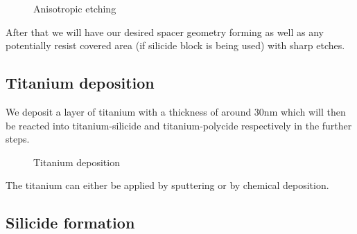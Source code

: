 \begin{figure}[H]
	\centering
	\begin{tikzpicture}[node distance = 3cm, auto, thick,scale=\CrossSectionOnly, every node/.style={transform shape}]
		
	\end{tikzpicture}
	\begin{tikzpicture}[node distance = 3cm, auto, thick,scale=\CrossSectionOnly, every node/.style={transform shape}]
		
	\end{tikzpicture}
	\caption{Anisotropic etching}
\end{figure}

After that we will have our desired spacer geometry forming as well as any potentially resist covered area (if silicide block is being used) with sharp etches.

\newpage

\subsection{Titanium deposition}

We deposit a layer of titanium with a thickness of around 30nm which will then be reacted into titanium-silicide and titanium-polycide respectively in the further steps.

\begin{figure}[H]
	\centering
	\begin{tikzpicture}[node distance = 3cm, auto, thick,scale=\CrossSectionOnly, every node/.style={transform shape}]
		
	\end{tikzpicture}
	\begin{tikzpicture}[node distance = 3cm, auto, thick,scale=\CrossSectionOnly, every node/.style={transform shape}]
		
	\end{tikzpicture}
	\caption{Titanium deposition}
\end{figure}

The titanium can either be applied by sputtering or by chemical deposition.

\newpage

\subsection{Silicide formation}

